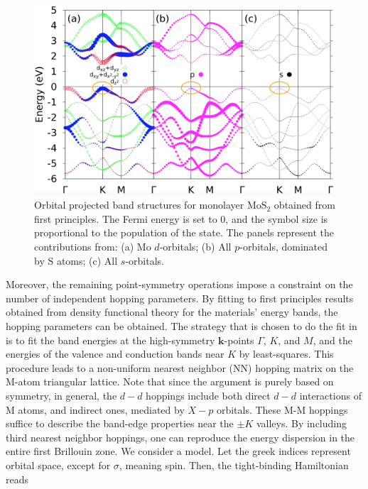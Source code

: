 \begin{figure}[H]
\centering
\includegraphics[scale = 0.2]{images/energiesTMDs}
 \caption{Orbital projected band structures for monolayer $\text{Mo}\text{S}_2$ obtained from first principles.
The Fermi energy is set to 0, and the symbol size is proportional to the population of the state.
The panels represent the contributions from: (a) $\text{Mo}$ $d$-orbitals; (b) All $p$-orbitals, dominated by $\text{S}$ atoms; (c) All $s$-orbitals. \label{fig:nanoribbons_energiesTMDs}}
\end{figure}
Moreover, the remaining point-symmetry operations impose a constraint on the number of independent hopping parameters.
By fitting to first principles results obtained from density functional theory %
for the materials' energy bands, the hopping parameters can be obtained.
The strategy that is chosen to do the fit in \cite{liu_three-band_2013} is to fit the band energies at the high-symmetry $\bm k$-points $\Gamma$, $K$, and $M$, and the energies of the valence and conduction bands near $K$ by least-squares.
This procedure leads to a non-uniform nearest neighbor (NN) hopping matrix on the M-atom triangular lattice.
Note that since the argument is purely based on symmetry, in general, the $d-d$ hoppings include both direct $d-d$ interactions of M atoms, and indirect ones, mediated by $X-p$ orbitals.
These M-M hoppings suffice to describe the band-edge properties near the $\pm K$ valleys.
By including third nearest neighbor hoppings, one can reproduce the energy dispersion in  the entire first Brillouin zone.
We consider a  model.
Let the greek indices represent orbital space, except for $\sigma$, meaning spin.
Then, the  tight-binding Hamiltonian reads
